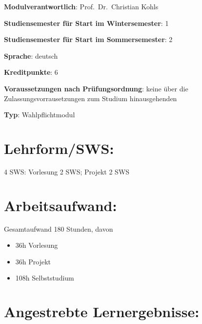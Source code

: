 \begin{modulHead}
\textbf{Modulverantwortlich}: Prof.~Dr.~Christian
Kohls
\end{modulHead}
\begin{modulHead}
\textbf{Studiensemester für
Start im Wintersemester}:
1
\end{modulHead}
\begin{modulHead}
\textbf{Studiensemester für Start
im Sommersemester}:
2
\end{modulHead}
\begin{modulHead}
\textbf{Sprache}:
deutsch
\end{modulHead}
\begin{modulHead}
\textbf{Kreditpunkte}:
6
\end{modulHead}
\begin{modulHead}
\textbf{Voraussetzungen nach
Prüfungsordnung}: keine über die Zulassungsvorrausetzungen zum Studium
hinausgehenden
\end{modulHead}
\begin{modulHead}
\textbf{Typ}:
Wahlpflichtmodul
\end{modulHead}


\section*{Lehrform/SWS:\label{/mi-2017/modulbeschreibungen-master/MA_SC_WPF_eScience}}\label{lehrformswspathlabelmi-2017modulbeschreibungen-mastermaux5fscux5fwpfux5fescience}

4 SWS: Vorlesung 2 SWS; Projekt 2 SWS

\section*{Arbeitsaufwand:\label{/mi-2017/modulbeschreibungen-master/MA_SC_WPF_eScience}}\label{arbeitsaufwandpathlabelmi-2017modulbeschreibungen-mastermaux5fscux5fwpfux5fescience}

Gesamtaufwand 180 Stunden, davon

\begin{itemize}
\tightlist
\item
  36h Vorlesung
\item
  36h Projekt
\item
  108h Selbststudium
\end{itemize}

\section*{Angestrebte
Lernergebnisse:\label{/mi-2017/modulbeschreibungen-master/MA_SC_WPF_eScience}}\label{angestrebte-lernergebnissepathlabelmi-2017modulbeschreibungen-mastermaux5fscux5fwpfux5fescience}

